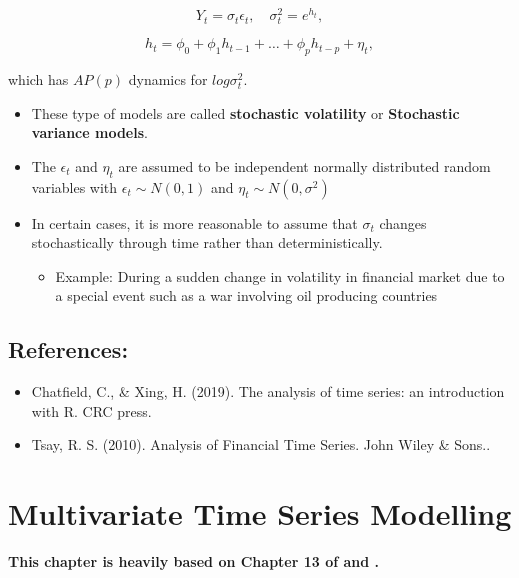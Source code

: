 \documentclass[]{book}
\providecommand{\tightlist}{%
  \setlength{\itemsep}{0pt}\setlength{\parskip}{0pt}}
\begin{document}
\[Y_t=\sigma_t\epsilon_t, \quad \sigma_t^2=e^{h_t},\]

\[h_t=\phi_0+\phi_1h_{t-1}+\dots+\phi_ph_{t-p}+\eta_t,\]

which has \(AP(p)\) dynamics for \(log\sigma_t^2.\)

\begin{itemize}
\tightlist
\item
  These type of models are called \textbf{stochastic volatility} or \textbf{Stochastic variance models}.
\item
  The \(\epsilon_t\) and \(\eta_t\) are assumed to be independent normally distributed random variables with \(\epsilon_t\sim N(0,1)\) and \(\eta_t\sim N(0,\sigma^2)\)
\item
  In certain cases, it is more reasonable to assume that \(\sigma_t\) changes stochastically through time rather than deterministically.

  \begin{itemize}
  \tightlist
  \item
    Example: During a sudden change in volatility in financial market due to a special event such as a war involving oil producing countries
  \end{itemize}
\end{itemize}

\hypertarget{references-2}{%
\section{References:}\label{references-2}}

\begin{itemize}
\item
  Chatfield, C., \& Xing, H. (2019). The analysis of time series: an introduction with R. CRC press.
\item
  Tsay, R. S. (2010). Analysis of Financial Time Series. John Wiley \& Sons..
  \newpage
\end{itemize}

\hypertarget{multivariate-time-series-modelling}{%
\chapter{Multivariate Time Series Modelling}\label{multivariate-time-series-modelling}}


\textbf{This chapter is heavily based on Chapter 13 of \citet{chatfield2019analysis} and \citet{tsay2013multivariate} .}
\end{document}
